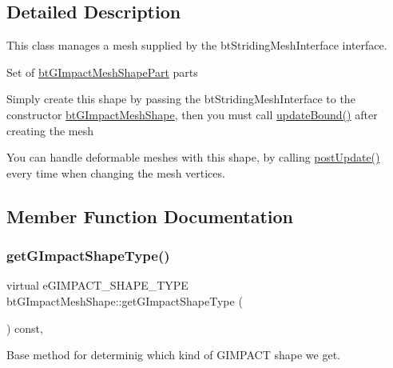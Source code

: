 \subsection{Detailed Description}
This class manages a mesh supplied by the bt\+Striding\+Mesh\+Interface interface. 

Set of \hyperlink{classbtGImpactMeshShapePart}{bt\+G\+Impact\+Mesh\+Shape\+Part} parts
\begin{DoxyItemize}
\item Simply create this shape by passing the bt\+Striding\+Mesh\+Interface to the constructor \hyperlink{classbtGImpactMeshShape}{bt\+G\+Impact\+Mesh\+Shape}, then you must call \hyperlink{classbtGImpactShapeInterface_acb26c2d7a2aecabd06b996b72b848492}{update\+Bound()} after creating the mesh
\item You can handle deformable meshes with this shape, by calling \hyperlink{classbtGImpactMeshShape_afbf7ae3408bc0ab975c46ed65820a4b2}{post\+Update()} every time when changing the mesh vertices. 
\end{DoxyItemize}

\subsection{Member Function Documentation}
\mbox{\label{classbtGImpactMeshShape_ac48641f3b35339f6de0716197bbbe302}} 
\subsubsection{\texorpdfstring{get\+G\+Impact\+Shape\+Type()}{getGImpactShapeType()}\hspace{0.1cm}{\footnotesize\ttfamily [1/2]}}
{\footnotesize\ttfamily virtual e\+G\+I\+M\+P\+A\+C\+T\+\_\+\+S\+H\+A\+P\+E\+\_\+\+T\+Y\+PE bt\+G\+Impact\+Mesh\+Shape\+::get\+G\+Impact\+Shape\+Type (\begin{DoxyParamCaption}{ }\end{DoxyParamCaption}) const\hspace{0.3cm}{\ttfamily [inline]}, {\ttfamily [virtual]}}



Base method for determinig which kind of G\+I\+M\+P\+A\+CT shape we get. 

